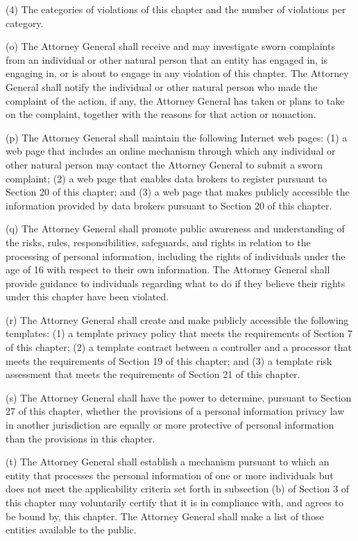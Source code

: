 (4) The categories of violations of this chapter and the number of violations per category.

(o) The Attorney General shall receive and may investigate sworn complaints from an individual or other natural person that an entity has engaged in, is engaging in, or is about to engage in any violation of this chapter. The Attorney General shall notify the individual or other natural person who made the complaint of the action, if any, the Attorney General has taken or plans to take on the complaint, together with the reasons for that action or nonaction.

(p) The Attorney General shall maintain the following Internet web pages: (1) a web page that includes an online mechanism through which any individual or other natural person may contact the Attorney General to submit a sworn complaint; (2) a web page that enables data brokers to register pursuant to Section 20 of this chapter; and (3) a web page that makes publicly accessible the information provided by data brokers pursuant to Section 20 of this chapter.

(q) The Attorney General shall promote public awareness and understanding of the risks, rules, responsibilities, safeguards, and rights in relation to the processing of personal information, including the rights of individuals under the age of 16 with respect to their own information. The Attorney General shall provide guidance to individuals regarding what to do if they believe their rights under this chapter have been violated.

(r) The Attorney General shall create and make publicly accessible the following templates: (1) a template privacy policy that meets the requirements of Section 7 of this chapter; (2) a template contract between a controller and a processor that meets the requirements of Section 19 of this chapter; and (3) a template risk assessment that meets the requirements of Section 21 of this chapter.

(s) The Attorney General shall have the power to determine, pursuant to Section 27 of this chapter, whether the provisions of a personal information privacy law in another jurisdiction are equally or more protective of personal information than the provisions in this chapter.

(t) The Attorney General shall establish a mechanism pursuant to which an entity that processes the personal information of one or more individuals but does not meet the applicability criteria set forth in subsection (b) of Section 3 of this chapter may voluntarily certify that it is in compliance with, and agrees to be bound by, this chapter. The Attorney General shall make a list of those entities available to the public. 

